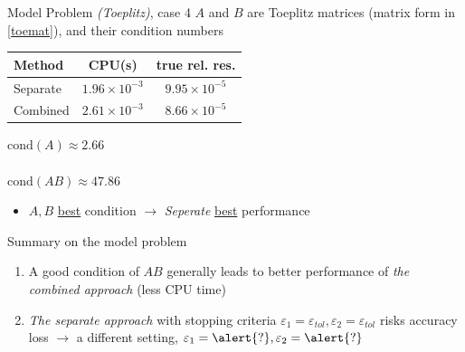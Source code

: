 \documentclass[aspectratio=169]{beamer}
\begin{document}
\begin{frame}{Model Problem \textit{(Toeplitz)}, case 4}
	$A$ and $B$ are Toeplitz matrices (matrix form in \eqref{toemat}), and their condition numbers

	\begin{minipage}[t]{0.63\textwidth}
		\vspace{0pt}
		\centering
		\begin{tabular}{l c c}
			\toprule
			Method & CPU(s) & true rel. res.\\
			\midrule
			Separate& \underline{$1.96 \times 10^{-3}$} & $9.95 \times 10^{-5}$ \\
			Combined& $2.61 \times 10^{-3}$& \underline{$8.66 \times 10^{-5}$}\\
			\bottomrule
		\end{tabular}
	\end{minipage}%
	\hfill
	\begin{minipage}[t]{0.33\textwidth}
		\vspace{0pt}
		\underline{$\mathrm{cond} (A) \approx 2.66 $}\\
		\\
		$\mathrm{cond} (AB) \approx 47.86$
	\end{minipage}

	\begin{itemize}
		\item $A,B$ \underline{best} condition $\rightarrow$ \textit{Seperate} \underline{best} performance
	\end{itemize}
\end{frame}
\begin{frame}{Summary on the model problem}
	\begin{enumerate}
		\item A good condition of $AB$ generally leads to better performance of \textit{the combined approach} (less CPU time)
		\item \textit{The separate approach} with stopping criteria $\varepsilon_{1} = \varepsilon_{tol}, \varepsilon_{2} = \varepsilon_{tol}$ risks accuracy loss $\rightarrow$ a different setting, $\varepsilon_{1} = \alert{?}, \varepsilon_{2} = \alert{?}$
	\end{enumerate}
\end{frame}
\end{document}
